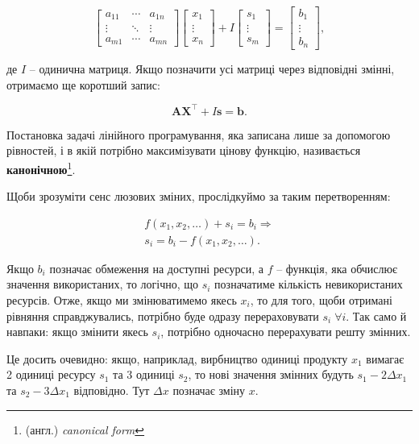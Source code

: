 \documentclass[\main/book.tex]{subfiles}
\begin{document}
$$
 \left[
 \begin{array}{ccc}
  a_{11} & \cdots & a_{1n} \\
  \vdots & \ddots & \vdots \\
  a_{m1} & \cdots & a_{mn}
 \end{array}
 \right]
 \left[
 \begin{array}{c}
  x_1 \\ \vdots \\ x_n
 \end{array}
 \right] +
 I \left[
 \begin{array}{c}
  s_1 \\ \vdots \\ s_m
 \end{array}
 \right] =
 \left[
 \begin{array}{c}
  b_1 \\ \vdots \\ b_n
 \end{array}
 \right],
$$

де $I$ -- одинична матриця. Якщо позначити усі матриці через відповідні змінні, отримаємо ще коротший запис:

$$
\mathbf{A}\mathbf{X}^\top + I \mathbf{s} = \mathbf{b}.
$$

Постановка задачі лінійного програмування, яка записана лише за допомогою рівностей, і в якій потрібно максимізувати цінову функцію, називається \textbf{канонічною}\footnote{(англ.) \textit{canonical form}}.

Щоби зрозуміти сенс люзових зміних, прослідкуймо за таким перетворенням:

\begin{equation}
\begin{split}
 f(x_1, x_2, \ldots) + s_i = b_i \Rightarrow \\
 s_i = b_i - f(x_1, x_2, \ldots).
\end{split}
\label{eq:linear:slack_variables}
\end{equation}

Якщо $b_i$ позначає обмеження на доступні ресурси, а $f$ -- функція, яка обчислює значення використаних, то логічно, що $s_i$ позначатиме кількість невикористаних ресурсів. Отже, якщо ми змінюватимемо якесь $x_i$, то для того, щоби отримані рівняння справджувались, потрібно буде одразу перераховувати ${s_i \; \forall i}$. Так само й навпаки: якщо змінити якесь $s_i$, потрібно одночасно перерахувати решту змінних.

\begin{note}
 Це досить очевидно: якщо, наприклад, вирбництво одиниці продукту $x_1$ вимагає 2 одиниці ресурсу $s_1$ та 3 одиниці $s_2$, то нові значення змінних будуть $s_1 - 2 \Delta x_1$ та $s_2 - 3 \Delta x_1$ відповідно. Тут $\Delta x$ позначає зміну $x$.
\end{note}
\end{document}
